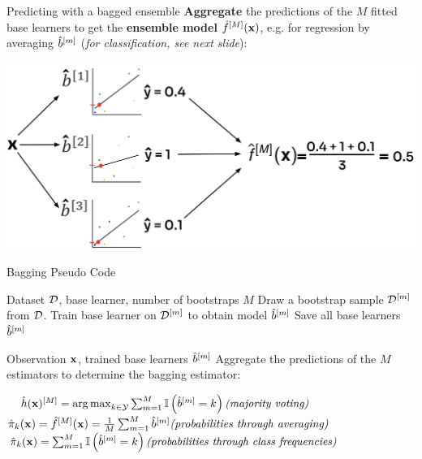 \documentclass[11pt,compress,t,notes=noshow, xcolor=table]{beamer}
\begin{document}
\begin{vbframe}{Predicting with a bagged ensemble}
\textbf{Aggregate} the predictions of the $M$ fitted base learners to get the \textbf{ensemble model} $\hat f^{[M]}(\mathbf{x})$, e.g. for regression by averaging $\hat{b}^{[m]}$ (\textit{for classification, see next slide}):

\begin{center}
\includegraphics[width=1\textwidth]{figure_man/forest-bagg_regr.png}
\end{center}
\end{vbframe}


\begin{vbframe}{Bagging Pseudo Code}

\begin{algorithm}[H]
  \footnotesize
  \caption*{Bagging algorithm: Training}
  \begin{algorithmic}[1]
     Dataset $\mathcal{D}$, base learner, number of bootstraps $M$
      \State Draw a bootstrap sample $\mathcal{D}^{[m]}$ from $\mathcal{D}$.
      \State Train base learner on $\mathcal{D}^{[m]}$ to obtain model $\hat{b}^{[m]}$
    \EndFor
    \State Save all base learners $\hat{b}^{[m]}$
  \end{algorithmic}
\end{algorithm}

\begin{algorithm}[H]
  \footnotesize
  \caption*{Bagging algorithm: Prediction in case of classification}
  \begin{algorithmic}[1]
     Observation $\mathbf{x}$, trained base learners $\hat{b}^{[m]}$
    \State Aggregate the predictions of the $M$ estimators to determine the bagging estimator:
    \begin{center}
    $\quad \hat{h}(\mathbf{x})^{[M]} = \operatorname*{arg\,max}_{k \in \mathcal{Y}} \sum_{m=1}^M \mathbb{I}\left(\hat{b}^{[m]} = k\right) \textit{(majority voting)}$
    $ \hat \pi_{k}(\mathbf{x})= \hat f^{[M]}(\mathbf{x}) = \frac{1}{M} \sum_{m=1}^M \hat{b}^{[m]} \textit{(probabilities through averaging)}$
    $\hat \pi_{k}(\mathbf{x})= \sum_{m=1}^M \mathbb{I}\left(\hat{b}^{[m]} = k\right) \textit{(probabilities through class frequencies)}$
    \end{center}
  \end{algorithmic}
\end{algorithm}

\end{vbframe}
\end{document}
